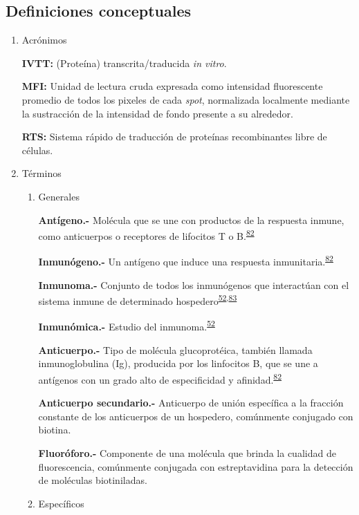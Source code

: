 \documentclass[]{article}
\begin{document}
\subsection{Definiciones conceptuales}\label{definiciones-conceptuales}

\begin{enumerate}
\def\labelenumi{\alph{enumi}.}
\item
  Acrónimos

  \textbf{IVTT:} (Proteína) transcrita/traducida \emph{in vitro}.

  \textbf{MFI:} Unidad de lectura cruda expresada como intensidad
  fluorescente promedio de todos los pixeles de cada \emph{spot},
  normalizada localmente mediante la sustracción de la intensidad de
  fondo presente a su alrededor.

  \textbf{RTS:} Sistema rápido de traducción de proteínas recombinantes
  libre de células.
\item
  Términos

  \begin{enumerate}
  \def\labelenumii{\roman{enumii}.}
  \item
    Generales

    \textbf{Antígeno.-} Molécula que se une con productos de la
    respuesta inmune, como anticuerpos o receptores de lifocitos T o
    B.\textsuperscript{\protect\hyperlink{ref-abbas2012}{82}}

    \textbf{Inmunógeno.-} Un antígeno que induce una respuesta
    inmunitaria.\textsuperscript{\protect\hyperlink{ref-abbas2012}{82}}

    \textbf{Inmunoma.-} Conjunto de todos los inmunógenos que
    interactúan con el sistema inmune de determinado
    hospedero\textsuperscript{\protect\hyperlink{ref-immunomics2016}{52},\protect\hyperlink{ref-sette2005}{83}}

    \textbf{Inmunómica.-} Estudio del
    inmunoma.\textsuperscript{\protect\hyperlink{ref-immunomics2016}{52}}

    \textbf{Anticuerpo.-} Tipo de molécula glucoprotéica, también
    llamada inmunoglobulina (Ig), producida por los linfocitos B, que se
    une a antígenos con un grado alto de especificidad y
    afinidad.\textsuperscript{\protect\hyperlink{ref-abbas2012}{82}}

    \textbf{Anticuerpo secundario.-} Anticuerpo de unión específica a la
    fracción constante de los anticuerpos de un hospedero, comúnmente
    conjugado con biotina.

    \textbf{Fluoróforo.-} Componente de una molécula que brinda la
    cualidad de fluorescencia, comúnmente conjugada con estreptavidina
    para la detección de moléculas biotiniladas.
  \item
    Específicos


\end{enumerate}
\end{enumerate}
\end{document}
